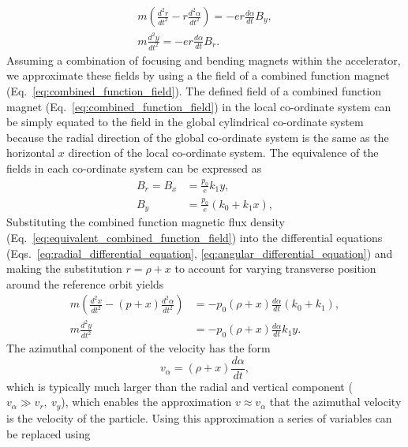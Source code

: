 \documentclass[../main.tex]{subfiles}
\begin{document}
\begin{align}
m\left(\frac{d^{2}r}{dt^{2}}-r\frac{d^{2}\alpha}{dt^{2}}\right)=-er\frac{d\alpha}{dt}B_{y},
\label{eq:radial_differential_equation} \\
m\frac{d^{2}y}{dt^{2}}=-er\frac{d\alpha}{dt}B_{r}.
\label{eq:angular_differential_equation}
\end{align}
Assuming a combination of focusing and bending magnets within the accelerator, we approximate these fields by using a the field of a combined function magnet (Eq.~\ref{eq:combined_function_field}). The defined field of a combined function magnet (Eq.~\ref{eq:combined_function_field}) in the local co-ordinate system can be simply equated to the field in the global cylindrical co-ordinate system  because the radial direction of the global co-ordinate system is the same as the horizontal $x$ direction of the local co-ordinate system. The equivalence of the fields in each co-ordinate system can be expressed as
\begin{align}
B_{r} = B_{x} &= \frac{p_{0}}{e}k_{1}y, \\
B_{y} &= \frac{p_{0}}{e}\left(k_{0}+k_{1}x\right),
\label{eq:equivalent_combined_function_field}
\end{align}
Substituting the combined function magnetic flux density (Eq.~\ref{eq:equivalent_combined_function_field}) into the differential equations (Eqs.~\ref{eq:radial_differential_equation}, \ref{eq:angular_differential_equation}) and making the substitution $r=\rho+x$ to account for varying transverse position around the reference orbit yields
\begin{align}
m\left(\frac{d^{2}x}{dt^{2}}-\left(p+x\right)\frac{d^{2}\alpha}{dt^{2}}\right) &=-p_{0}\left(\rho+x\right)\frac{d\alpha}{dt}\left(k_{0}+k_{1}\right), 
\label{eq:horizontal_differential_equation}\\   
m\frac{d^{2}y}{dt^{2}} &= -p_{0}\left(\rho+x\right)\frac{d\alpha}{dt}k_{1}y.
\label{eq:vertical_differential_equation}
\end{align}
The azimuthal component of the velocity has the form
\begin{equation}
v_{\alpha} = \left(\rho+x\right)\frac{d\alpha}{dt},
\label{eq:azimuthal_velocity}    
\end{equation}
which is typically much larger than the radial and vertical component ($v_{\alpha}\gg v_{r},~v_{y}$), which enables the approximation $v\approx v_{\alpha}$ that the azimuthal velocity is the velocity of the particle. Using this approximation a series of variables can be replaced using
\end{document}
